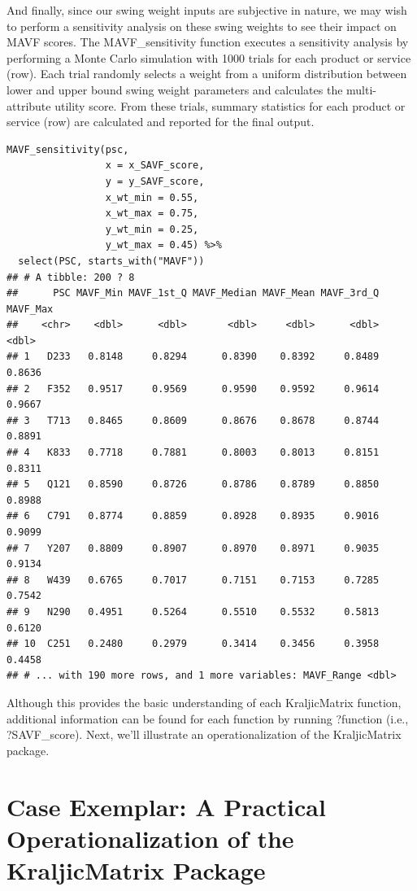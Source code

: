 \documentclass[twocolumn]{svjour3}       %
\begin{document}
And finally, since our swing weight inputs are subjective in nature, we may wish to perform a sensitivity analysis on these swing weights to see their impact on MAVF scores. The MAVF\_sensitivity function executes a sensitivity analysis by performing a Monte Carlo simulation with 1000 trials for each product or service (row). Each trial randomly selects a weight from a uniform distribution between lower and upper bound swing weight parameters and calculates the multi-attribute utility score. From these trials, summary statistics for each product or service (row) are calculated and reported for the final output. 
\begin{verbatim}
MAVF_sensitivity(psc,
                 x = x_SAVF_score,
                 y = y_SAVF_score,
                 x_wt_min = 0.55,
                 x_wt_max = 0.75,
                 y_wt_min = 0.25,
                 y_wt_max = 0.45) %>%
  select(PSC, starts_with("MAVF"))
## # A tibble: 200 ? 8
##      PSC MAVF_Min MAVF_1st_Q MAVF_Median MAVF_Mean MAVF_3rd_Q MAVF_Max
##    <chr>    <dbl>      <dbl>       <dbl>     <dbl>      <dbl>    <dbl>
## 1   D233   0.8148     0.8294      0.8390    0.8392     0.8489   0.8636
## 2   F352   0.9517     0.9569      0.9590    0.9592     0.9614   0.9667
## 3   T713   0.8465     0.8609      0.8676    0.8678     0.8744   0.8891
## 4   K833   0.7718     0.7881      0.8003    0.8013     0.8151   0.8311
## 5   Q121   0.8590     0.8726      0.8786    0.8789     0.8850   0.8988
## 6   C791   0.8774     0.8859      0.8928    0.8935     0.9016   0.9099
## 7   Y207   0.8809     0.8907      0.8970    0.8971     0.9035   0.9134
## 8   W439   0.6765     0.7017      0.7151    0.7153     0.7285   0.7542
## 9   N290   0.4951     0.5264      0.5510    0.5532     0.5813   0.6120
## 10  C251   0.2480     0.2979      0.3414    0.3456     0.3958   0.4458
## # ... with 190 more rows, and 1 more variables: MAVF_Range <dbl>
\end{verbatim}

Although this provides the basic understanding of each KraljicMatrix function, additional information can be found for each function by running ?function (i.e., ?SAVF\_score).  Next, we'll illustrate an operationalization of the KraljicMatrix package. 


\section{Case Exemplar: A Practical Operationalization of the KraljicMatrix Package}
\label{sec:5}
\end{document}
